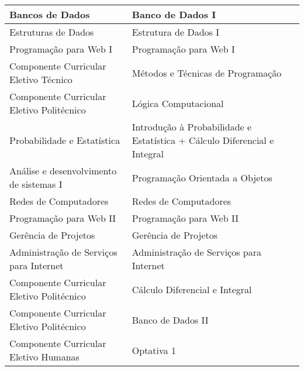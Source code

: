 \documentclass[11pt,fleqn]{book} %
\begin{document}
\begin{table}[H]
{\begin{tabular}{|l|l|}
			Bancos de Dados                           & Banco de Dados I                                                                                 \\ \hline
			Estruturas de Dados                       & Estrutura de Dados I                                                                             \\ \hline
			Programação para Web I                    & Programação para Web I                                                                           \\ \hline
			Componente Curricular Eletivo Técnico     & Métodos e Técnicas de Programação                                                                \\ \hline
			Componente Curricular Eletivo Politécnico & Lógica Computacional                                                                             \\ \hline
			Probabilidade e Estatística               & Introdução à Probabilidade e Estatística + Cálculo Diferencial e Integral                        \\ \hline
			Análise e desenvolvimento de sistemas I   & Programação Orientada a Objetos                                                                  \\ \hline
			Redes de Computadores                     & Redes de Computadores                                                                            \\ \hline
			Programação para Web II                   & Programação para Web II                                                                          \\ \hline
			Gerência de Projetos                      & Gerência de Projetos                                                                             \\ \hline
			Administração de Serviços para Internet   & Administração de Serviços para Internet                                                          \\ \hline
			Componente Curricular Eletivo Politécnico & Cálculo Diferencial e Integral                                                                   \\ \hline
			Componente Curricular Eletivo Politécnico & Banco de Dados II                                                                                \\ \hline
			Componente Curricular Eletivo Humanas     & Optativa 1                                                                                       \\ \hline

\end{tabular}}
\end{table}
\end{document}
